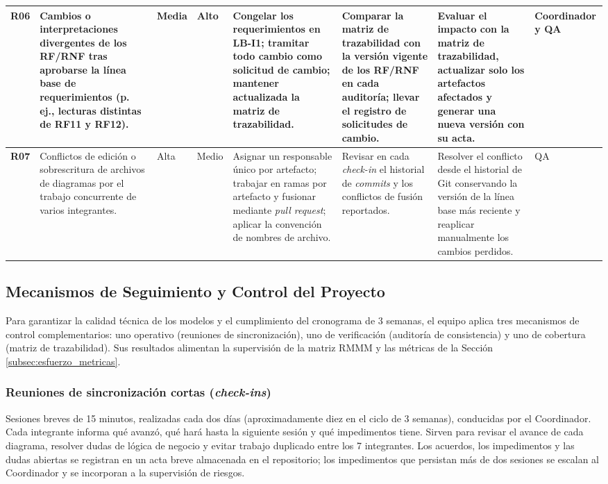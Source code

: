 {\begin{xltabular}{\textwidth}{|>{\raggedright\arraybackslash}p{0.7cm}|>{\raggedright\arraybackslash}p{2.3cm}|>{\centering\arraybackslash}p{0.9cm}|>{\centering\arraybackslash}p{1.0cm}|X|X|X|>{\raggedright\arraybackslash}p{1.6cm}|}
    \hline
    \textbf{R06} & Cambios o interpretaciones divergentes de los RF/RNF tras aprobarse la línea base de requerimientos (p. ej., lecturas distintas de RF11 y RF12). & Media & Alto & Congelar los requerimientos en LB-I1; tramitar todo cambio como solicitud de cambio; mantener actualizada la matriz de trazabilidad. & Comparar la matriz de trazabilidad con la versión vigente de los RF/RNF en cada auditoría; llevar el registro de solicitudes de cambio. & Evaluar el impacto con la matriz de trazabilidad, actualizar solo los artefactos afectados y generar una nueva versión con su acta. & Coordinador y QA \\*
    \hline
    \textbf{R07} & Conflictos de edición o sobrescritura de archivos de diagramas por el trabajo concurrente de varios integrantes. & Alta & Medio & Asignar un responsable único por artefacto; trabajar en ramas por artefacto y fusionar mediante \textit{pull request}; aplicar la convención de nombres de archivo. & Revisar en cada \textit{check-in} el historial de \textit{commits} y los conflictos de fusión reportados. & Resolver el conflicto desde el historial de Git conservando la versión de la línea base más reciente y reaplicar manualmente los cambios perdidos. & QA \\
    \hline
\end{xltabular}
}

\subsection{Mecanismos de Seguimiento y Control del Proyecto}
\label{subsec:seguimiento_control}

Para garantizar la calidad técnica de los modelos y el cumplimiento del cronograma de 3 semanas, el equipo aplica tres mecanismos de control complementarios: uno operativo (reuniones de sincronización), uno de verificación (auditoría de consistencia) y uno de cobertura (matriz de trazabilidad). Sus resultados alimentan la supervisión de la matriz RMMM y las métricas de la Sección \ref{subsec:esfuerzo_metricas}.

\subsubsection{Reuniones de sincronización cortas (\textit{check-ins})}
Sesiones breves de 15 minutos, realizadas cada dos días (aproximadamente diez en el ciclo de 3 semanas), conducidas por el Coordinador. Cada integrante informa qué avanzó, qué hará hasta la siguiente sesión y qué impedimentos tiene. Sirven para revisar el avance de cada diagrama, resolver dudas de lógica de negocio y evitar trabajo duplicado entre los 7 integrantes. Los acuerdos, los impedimentos y las dudas abiertas se registran en un acta breve almacenada en el repositorio; los impedimentos que persistan más de dos sesiones se escalan al Coordinador y se incorporan a la supervisión de riesgos.

